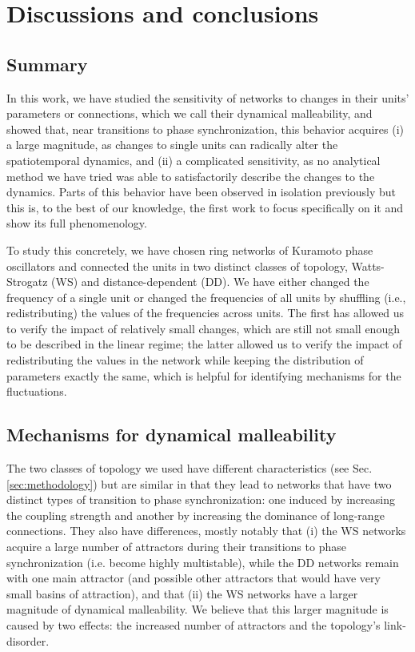 \section{Discussions and conclusions}\label{sec:discussion_conclusion}
\subsection*{Summary}
In this work, we have studied the sensitivity of networks to changes in their units' parameters or connections, which we call their dynamical malleability, and showed that, near transitions to phase synchronization, this behavior acquires (i) a large magnitude, as changes to single units can radically alter the spatiotemporal dynamics, and (ii) a complicated sensitivity, as no analytical method we have tried was able to satisfactorily describe the changes to the dynamics. Parts of this behavior have been observed in isolation previously \cite{budzinski2020synchronization, taylor2016synchronization, hong2002synchronization, peter2018transition, fernandez2022emergence, budzinski2019synchronous} but this is, to the best of our knowledge, the first work to focus specifically on it and show its full phenomenology. 

To study this concretely, we have chosen ring networks of Kuramoto phase oscillators and connected the units in two distinct classes of topology, Watts-Strogatz (WS) and distance-dependent (DD). We have either changed the frequency of a single unit or changed the frequencies of all units by shuffling (i.e., redistributing) the values of the frequencies across units. The first has allowed us to verify the impact of relatively small changes, which are still not small enough to be described in the linear regime; the latter allowed us to verify the impact of redistributing the values in the network while keeping the distribution of parameters exactly the same, which is helpful for identifying mechanisms for the fluctuations. 

\subsection*{Mechanisms for dynamical malleability}
The two classes of topology we used have different characteristics (see Sec. \ref{sec:methodology}) but are similar in that they lead to networks that have two distinct types of transition to phase synchronization: one induced by increasing the coupling strength and another by increasing the dominance of long-range connections. They also have differences, mostly notably that (i) the WS networks acquire a large number of attractors during their transitions to phase synchronization (i.e. become highly multistable), while the DD networks remain with one main attractor (and possible other attractors that would have very small basins of attraction), and that (ii) the WS networks have a larger magnitude of dynamical malleability. We believe that this larger magnitude is caused by two effects: the increased number of attractors and the topology's link-disorder.

